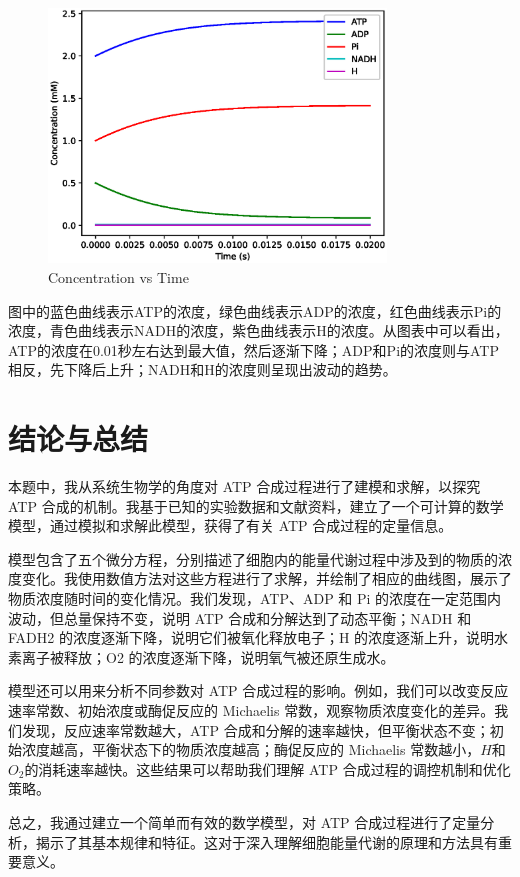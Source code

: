 \documentclass{ctexart}
\begin{document}
\begin{figure}[!htb]
	\centering
	\includegraphics[width=0.8\textwidth]{img/output.eps}	
	\caption{Concentration vs Time}    
\end{figure}

图中的蓝色曲线表示ATP的浓度，绿色曲线表示ADP的浓度，红色曲线表示Pi的浓度，青色曲线表示NADH的浓度，紫色曲线表示H的浓度。从图表中可以看出，ATP的浓度在0.01秒左右达到最大值，然后逐渐下降；ADP和Pi的浓度则与ATP相反，先下降后上升；NADH和H的浓度则呈现出波动的趋势。

\section{结论与总结}

本题中，我从系统生物学的角度对 ATP 合成过程进行了建模和求解，以探究 ATP 合成的机制。我基于已知的实验数据和文献资料，建立了一个可计算的数学模型，通过模拟和求解此模型，获得了有关 ATP 合成过程的定量信息。

模型包含了五个微分方程，分别描述了细胞内的能量代谢过程中涉及到的物质的浓度变化。我使用数值方法对这些方程进行了求解，并绘制了相应的曲线图，展示了物质浓度随时间的变化情况。我们发现，ATP、ADP 和 Pi 的浓度在一定范围内波动，但总量保持不变，说明 ATP 合成和分解达到了动态平衡；NADH 和 FADH2 的浓度逐渐下降，说明它们被氧化释放电子；H 的浓度逐渐上升，说明水素离子被释放；O2 的浓度逐渐下降，说明氧气被还原生成水。

模型还可以用来分析不同参数对 ATP 合成过程的影响。例如，我们可以改变反应速率常数、初始浓度或酶促反应的 Michaelis 常数，观察物质浓度变化的差异。我们发现，反应速率常数越大，ATP 合成和分解的速率越快，但平衡状态不变；初始浓度越高，平衡状态下的物质浓度越高；酶促反应的 Michaelis 常数越小，$H$和$O_2$​的消耗速率越快。这些结果可以帮助我们理解 ATP 合成过程的调控机制和优化策略。

总之，我通过建立一个简单而有效的数学模型，对 ATP 合成过程进行了定量分析，揭示了其基本规律和特征。这对于深入理解细胞能量代谢的原理和方法具有重要意义。
\end{document}

